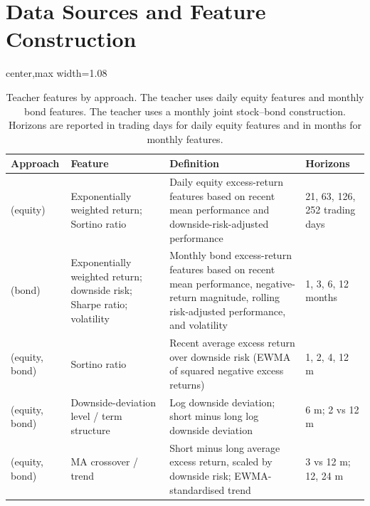 \section{Data Sources and Feature Construction}
\label{app:data-transformations}
\label{app:features}

\begin{table}[H]
    \centering
    \caption{Teacher features by approach. The \Bindep{} teacher uses daily equity features and monthly bond features. The \Acoup{} teacher uses a monthly joint stock--bond construction. Horizons are reported in trading days for daily equity features and in months for monthly features.}
    \label{tab:teacher-features}
    \small
    \begin{adjustbox}{center,max width=1.08\textwidth}
        \begin{tabular}{p{2.1cm}p{2.3cm}p{6.4cm}p{3.0cm}}
            \toprule
            Approach                & Feature                                                                & Definition                                                                                                                                         & Horizons                      \\
            \midrule
            \Bindep{} (equity)      & Exponentially weighted return; Sortino ratio                           & Daily equity excess-return features based on recent mean performance and downside-risk-adjusted performance                                        & 21, 63, 126, 252 trading days \\
            \Bindep{} (bond)        & Exponentially weighted return; downside risk; Sharpe ratio; volatility & Monthly bond excess-return features based on recent mean performance, negative-return magnitude, rolling risk-adjusted performance, and volatility & 1, 3, 6, 12 months            \\
            \midrule
            \Acoup{} (equity, bond) & Sortino ratio                                                          & Recent average excess return over downside risk (EWMA of squared negative excess returns)                                                          & 1, 2, 4, 12 m                 \\
            \Acoup{} (equity, bond) & Downside-deviation level / term structure                              & Log downside deviation; short minus long log downside deviation                                                                                    & 6 m; 2 vs 12 m                \\
            \Acoup{} (equity, bond) & MA crossover / trend                                                   & Short minus long average excess return, scaled by downside risk; EWMA-standardised trend                                                           & 3 vs 12 m; 12, 24 m           \\
            \bottomrule
        \end{tabular}
    \end{adjustbox}
\end{table}

